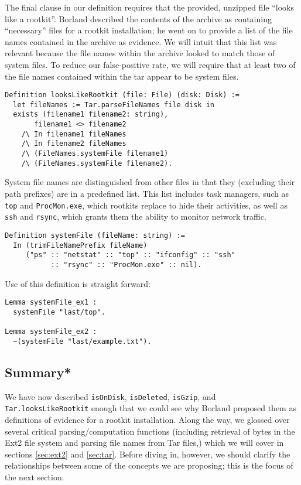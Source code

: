 \documentclass[nocopyrightspace]{sigplanconf}
\begin{document}
The final clause in our definition requires that the provided, unzipped file
``looks like a rootkit''. Borland described the contents of the archive as
containing ``necessary'' files for a rootkit installation; he went on to
provide a list of the file names contained in the archive as evidence. We will
intuit that this list was relevant because the file names within the archive
looked to match those of system files. To reduce our false-positive rate, we
will require that at least two of the file names contained within the tar
appear to be system files.

\begin{lstlisting}
Definition looksLikeRootkit (file: File) (disk: Disk) :=
  let fileNames := Tar.parseFileNames file disk in
  exists (filename1 filename2: string),
       filename1 <> filename2
    /\ In filename1 fileNames
    /\ In filename2 fileNames
    /\ (FileNames.systemFile filename1)
    /\ (FileNames.systemFile filename2).
\end{lstlisting}

System file names are distinguished from other files in that they (excluding
their path prefixes) are in a predefined list. This list includes task
managers, such as {\tt top} and {\tt ProcMon.exe}, which rootkits replace to
hide their activities, as well as {\tt ssh} and {\tt rsync}, which grants them
the ability to monitor network traffic.

\begin{lstlisting}
Definition systemFile (fileName: string) :=
  In (trimFileNamePrefix fileName)
     ("ps" :: "netstat" :: "top" :: "ifconfig" :: "ssh"
           :: "rsync" :: "ProcMon.exe" :: nil).
\end{lstlisting}

Use of this definition is straight forward:

\begin{lstlisting}
Lemma systemFile_ex1 : 
  systemFile "last/top".

Lemma systemFile_ex2 : 
  ~(systemFile "last/example.txt").
\end{lstlisting}

\subsection{Summary*}

We have now described {\tt isOnDisk}, {\tt isDeleted}, {\tt isGzip}, and {\tt
Tar.looksLikeRootkit} enough that we could see why Borland proposed them as
definitions of evidence for a rootkit installation. Along the way, we glossed
over several critical parsing/computation functions (including retrieval of
bytes in the Ext2 file system and parsing file names from Tar files,) which we
will cover in sections \ref{sec:ext2} and \ref{sec:tar}. Before diving in,
however, we should clarify the relationships between some of the concepts we
are proposing; this is the focus of the next section.
\end{document}
